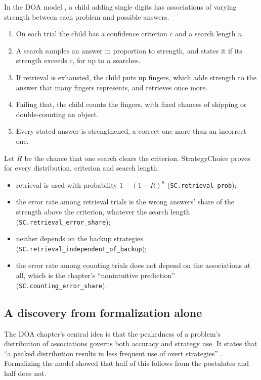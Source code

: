 \documentclass[11pt]{article}
\newcommand{\lean}[1]{\texttt{#1}}
\begin{document}
In the DOA model \citep{siegler1984}, a child adding single digits has associations of varying strength between each problem and possible answers.
\begin{enumerate}
  \item On each trial the child has a confidence criterion $c$ and a search length $n$.
  \item A search samples an answer in proportion to strength, and states it if its strength exceeds $c$, for up to $n$ searches.
  \item If retrieval is exhausted, the child puts up fingers, which adds strength to the answer that many fingers represents, and retrieves once more.
  \item Failing that, the child counts the fingers, with fixed chances of skipping or double-counting an object.
  \item Every stated answer is strengthened, a correct one more than an incorrect one.
\end{enumerate}
Let $R$ be the chance that one search clears the criterion. StrategyChoice proves for every distribution, criterion and search length:
\begin{itemize}
  \item retrieval is used with probability $1-(1-R)^n$ (\lean{SC.retrieval\_prob});
  \item the error rate among retrieval trials is the wrong answers' share of the strength above the criterion, whatever the search length (\lean{SC.retrieval\_error\_share});
  \item neither depends on the backup strategies (\lean{SC.retrieval\_independent\_of\_backup});
  \item the error rate among counting trials does not depend on the associations at all, which is the chapter's ``nonintuitive prediction'' (\lean{SC.counting\_error\_share}).
\end{itemize}

\subsection{A discovery from formalization alone}
\label{sec:peak}

The DOA chapter's central idea is that the peakedness of a problem's distribution of associations governs both accuracy and strategy use. It states that ``a peaked distribution results in less frequent use of overt strategies'' \citep[p.~245]{siegler1984}. Formalizing the model showed that half of this follows from the postulates and half does not.
\end{document}

